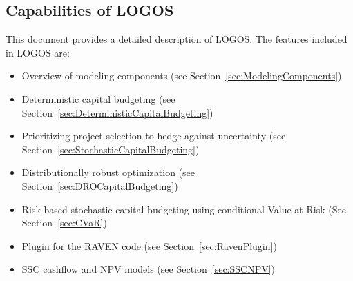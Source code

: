 \subsection{Capabilities of LOGOS}
This document provides a detailed description of LOGOS.
The features included in LOGOS are:
\begin{itemize}
    \item Overview of modeling components (see Section~\ref{sec:ModelingComponents})
	\item Deterministic capital budgeting (see Section~\ref{sec:DeterministicCapitalBudgeting})
	\item Prioritizing project selection to hedge against uncertainty (see Section~\ref{sec:StochasticCapitalBudgeting})
    \item Distributionally robust optimization (see Section~\ref{sec:DROCapitalBudgeting})
    \item Risk-based stochastic capital budgeting using conditional Value-at-Risk (See Section~\ref{sec:CVaR})
    \item Plugin for the RAVEN code (see Section~\ref{sec:RavenPlugin})
	\item SSC cashflow and NPV models (see Section~\ref{sec:SSCNPV})
\end{itemize}
